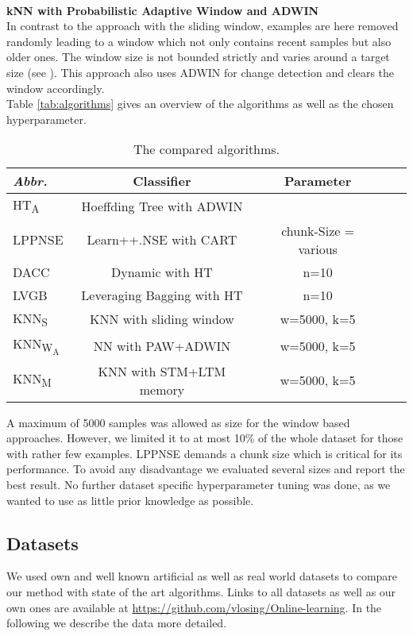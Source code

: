 \documentclass[conference]{IEEEtran}
\begin{document}
\\\textbf{kNN with Probabilistic Adaptive Window and ADWIN}\\
In contrast to the approach with the sliding window, examples are here removed randomly leading to a window which not only contains recent samples but also older ones. The window size is not bounded strictly
and varies around a target size (see \cite{Bifet:2013:EDS:2480362.2480516}). This approach also uses ADWIN for change detection and clears the window accordingly. \\
Table \ref{tab:algorithms} gives an overview of the algorithms as well as the chosen hyperparameter. 
\begin{table}
\def\arraystretch{0.9}
\footnotesize
\centering
\caption{The compared algorithms.}
\label{tab:algorithms}
\begin{tabular}{l|cccc}
\textit{Abbr.} & Classifier & Parameter\\\hline
HT\textsubscript{A} & Hoeffding Tree with ADWIN \\
LPPNSE & Learn++.NSE with CART& chunk-Size = various\\
DACC & Dynamic with HT& n=10\\
LVGB & Leveraging Bagging with HT& n=10\\
KNN\textsubscript{S} & KNN with sliding window & w=5000, k=5\\
KNN\textsubscript{W\textsubscript{A}} & NN with PAW+ADWIN& w=5000, k=5\\
KNN\textsubscript{M} &KNN with STM+LTM memory & w=5000, k=5\\
\end{tabular}
\label{tab:artDatasets}
\end{table}
A maximum of 5000 samples was allowed as size for the window based approaches. However,
we limited it to at most 10\% of the whole dataset for those with rather few examples. LPPNSE demands a chunk size which is critical for its performance. To avoid any disadvantage 
we evaluated several sizes and report the best result. No further dataset specific hyperparameter tuning was done, as we wanted to use as little prior knowledge as possible.

\subsection{Datasets}
We used own and well known artificial as well as real world datasets to compare our method with state of the art algorithms. 
Links to all datasets as well as our own ones are available at \url{https://github.com/vlosing/Online-learning}. In the following we describe the data more detailed.\\
\end{document}
